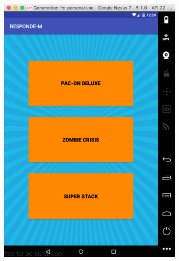 \documentclass[10pt]{article}
\begin{document}
\begin{figure}[H]
	\begin{center}
 		\includegraphics[width = 0.8\textwidth]{Imagenes/captura5.eps}
	\end{center} 
\end{figure}
\end{document}
